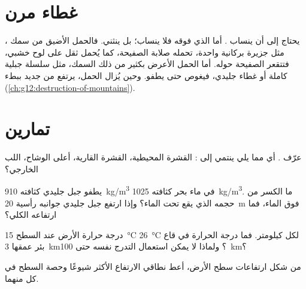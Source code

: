 \section{غطاء مرن}

يحتاج  إلى أن ينساب . أما  الذي فوقه فلا
ينساب؛ بل ينثني. فالحمل الأضيق من سمك ، مثل
جزيرة بركانية واحدة، تحمله صلابة الصفيحة، كما يُحمل
ثقل على لوح خشبي، فتتقعر الصفيحة حوله. أما الحمل الأعرض بكثير من ذلك
السمك، مثل سلسلة جبلية كاملة أو غطاء جليدي، فيغوص حتى
يطفو. وحين يُزال الحمل، يرتفع  من جديد ببطء
(\cref{ch:g12:destruction-of-mountains}).

\section{تمارين}

\begin{exercise}[$\star$]\label{exo:g11:lithosphere-asthenosphere:1}
عرّف  . أي مما يلي ينتمي
إلى : القشرة المحيطية، القشرة القارية، أعلى
الوشاح، اللب الخارجي؟
\end{exercise}

\begin{exercise}[$\star$]\label{exo:g11:lithosphere-asthenosphere:2}
يطفو جبل جليدي كثافته \qty{910}{kg/m^3} في ماء بحر كثافته
\qty{1025}{kg/m^3}. ما الكسر من حجمه الذي يقع تحت الماء؟ وإذا
ارتفع جبل جليدي جوانبه رأسية \qty{20}{m} فوق الماء، فما
ارتفاعه الكلي؟
\end{exercise}

\begin{exercise}[$\star$]\label{exo:g11:lithosphere-asthenosphere:3}
درجة حرارة الأرض عند السطح \qty{15}{\celsius} 
\qty{26}{\celsius} لكل كيلومتر. فما درجة الحرارة في قاع
بئر عمقها \qty{3}{km}؟ ولماذا لا يمكن استعمال التدرج نفسه حتى
\qty{100}{km}؟
\end{exercise}

\begin{exercise}[$\star$]\label{exo:g11:lithosphere-asthenosphere:4}
من شكل ارتفاعات سطح الأرض، أعط نطاقي الارتفاع الأكثر
شيوعًا وحصة السطح في كل منهما.
\end{exercise}

